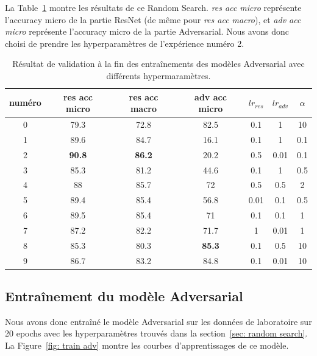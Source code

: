 La Table~\ref{tab:random search results} montre les résultats de ce Random Search. \textit{res acc micro} représente l'accuracy micro de la partie ResNet (de même pour \textit{res acc macro}), et \textit{adv acc micro} représente l'accuracy micro de la partie Adversarial. Nous avons donc choisi de prendre les hyperparamètres de l'expérience numéro 2.

\begin{table}[ht]
    \centering
    \begin{tabular}{ccccccc}
    \toprule
    numéro & res acc micro & res acc macro & adv acc micro & $lr_{res}$ & $lr_{adv}$ & $\alpha$ \\
    \midrule
    0 & 79.3 & 72.8 & 82.5 & 0.1 & 1 & 10 \\
    1 & 89.6 & 84.7 & 16.1 & 0.1 & 1 & 0.1 \\
    2 & \textbf{90.8} & \textbf{86.2} & 20.2 & 0.5 & 0.01 & 0.1 \\
    3 & 85.3 & 81.2 & 44.6 & 0.1 & 1 & 0.5 \\
    4 & 88 & 85.7 & 72 & 0.5 & 0.5 & 2 \\
    5 & 89.4 & 85.4 & 56.8 & 0.01 & 0.1 & 0.5 \\
    6 & 89.5 & 85.4 & 71 & 0.1 & 0.1 & 1 \\
    7 & 87.2 & 82.2 & 71.7 & 1 & 0.01 & 1 \\
    8 & 85.3 & 80.3 & \textbf{85.3} & 0.1 & 0.5 & 10 \\
    9 & 86.7 & 83.2 & 84.8 & 0.1 & 0.01 & 10 \\
    \bottomrule
    \end{tabular}
    \caption{Résultat de validation à la fin des entraînements des modèles Adversarial avec différents hypermaramètres.}
    \label{tab:random search results}
\end{table}

\subsection{Entraînement du modèle Adversarial}
Nous avons donc entraîné le modèle Adversarial sur les données de laboratoire sur 20 epochs avec les hyperparamètres trouvés dans la section~\ref{sec: random search}. La Figure~\ref{fig: train adv} montre les courbes d'apprentissages de ce modèle.

